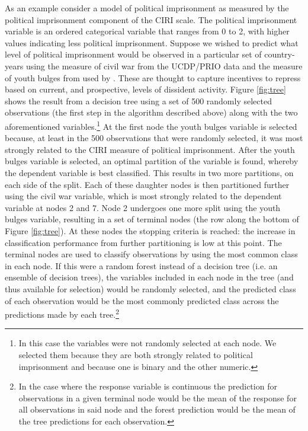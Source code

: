 \documentclass[11pt]{article}
\begin{document}
As an example consider a model of political imprisonment as measured by the political imprisonment component of the CIRI scale. The political imprisonment variable is an ordered categorical variable that ranges from 0 to 2, with higher values indicating less political imprisonment. Suppose we wished to predict what level of political imprisonment would be observed in a particular set of country-years using the measure of civil war from the UCDP/PRIO data \citep{ThemnerWallensteen2012} and the measure of youth bulges from \citet{Urdal2006} used by \citet{NordasDavenport2013}. These are thought to capture incentives to repress based on current, and prospective, levels of dissident activity. Figure \ref{fig:tree} shows the result from a decision tree using a set of 500 randomly selected observations (the first step in the algorithm described above) along with the two aforementioned variables.\footnote{In this case the variables were not randomly selected at each node. We selected them because they are both strongly related to political imprisonment and because one is binary and the other numeric.} At the first node the youth bulges variable is selected because, at least in the 500 observations that were randomly selected, it was most strongly related to the CIRI measure of political imprisonment. After the youth bulges variable is selected, an optimal partition of the variable is found, whereby the dependent variable is best classified. This results in two more partitions, on each side of the split. Each of these daughter nodes is then partitioned further using the civil war variable, which is most strongly related to the dependent variable at nodes 2 and 7. Node 2 undergoes one more split using the youth bulges variable, resulting in a set of terminal nodes (the row along the bottom of Figure \ref{fig:tree}). At these nodes the stopping criteria is reached: the increase in classification performance from further partitioning is low at this point. The terminal nodes are used to classify observations by using the most common class in each node. If this were a random forest instead of a decision tree (i.e. an ensemble of decision trees), the variables included in each node in the tree (and thus available for selection) would be randomly selected, and the predicted class of each observation would be the most commonly predicted class across the predictions made by each tree.\footnote{In the case where the response variable is continuous the prediction for observations in a given terminal node would be the mean of the response for all observations in said node and the forest prediction would be the mean of the tree predictions for each observation.}
\end{document}
